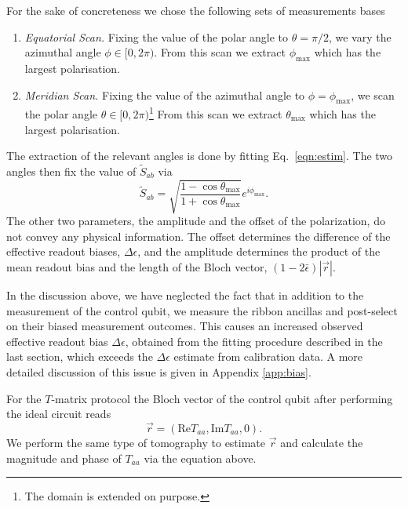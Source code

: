 \documentclass[a4paper,twocolumn,11pt]{quantumarticle}
\begin{document}
For the sake of concreteness we chose the following sets of measurements bases  \begin{enumerate}
    \item \emph{Equatorial Scan.} Fixing the value of the polar angle to $\theta = \pi/2$, we vary the azimuthal angle $\phi \in [0, 2\pi)$. From this scan we extract $\phi_{\text{max}}$ which has the largest polarisation.
    \item \emph{Meridian Scan.} Fixing the value of the azimuthal angle to $\phi = \phi_{\text{max}}$, we scan the polar angle $\theta \in [0, 2\pi)$\footnote{The domain is extended on purpose.} From this scan we extract $\theta_{\text{max}}$ which has the largest polarisation.
\end{enumerate}
The extraction of the relevant angles is done by fitting Eq.~\eqref{eqn:estim}.
The two angles then fix the value of $\tilde{S}_{ab}$ via $$\tilde{S}_{ab} = \sqrt{\frac{1-\cos{\theta_{\text{max}}}}{1+\cos{\theta_{\text{max}}}}}e^{i\phi_{\text{max}}}.$$
The other two parameters, the amplitude and the offset of the polarization, do not convey any physical information. The offset determines the difference of the effective readout biases, $\Delta\epsilon$, and the amplitude determines the product of the mean readout bias and the length of the Bloch vector, $(1-2\bar{\epsilon})|\vec{r}|$.


In the discussion above, we have neglected the fact that in addition to the measurement of the control qubit, we measure the ribbon ancillas and post-select on their biased measurement outcomes. This causes an increased observed effective readout bias $\Delta \epsilon$, obtained from the fitting procedure described in the last section, which exceeds the $\Delta \epsilon$ estimate from calibration data. A more detailed discussion of this issue is given in Appendix \ref{app:bias}. 


For the $T$-matrix protocol the Bloch vector of the control qubit after performing the ideal circuit reads
\begin{equation}
    \vec{r} = \left(  \text{Re}{T}_{aa}, \text{Im}{T}_{aa}, 0 \right).\label{eqn:blochT} 
\end{equation}
We perform the same type of tomography to estimate $\vec r$ and calculate the magnitude and phase of $T_{aa}$ via the equation above.
\end{document}
